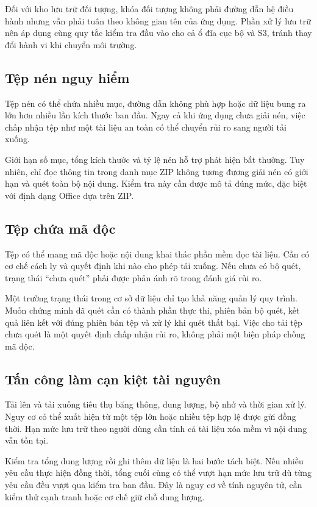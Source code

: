 Đối với kho lưu trữ đối tượng, khóa đối tượng không phải đường dẫn hệ điều hành nhưng vẫn phải tuân theo không gian tên của ứng dụng. Phần xử lý lưu trữ nên áp dụng cùng quy tắc kiểm tra đầu vào cho cả ổ đĩa cục bộ và S3, tránh thay đổi hành vi khi chuyển môi trường.
\subsection{Tệp nén nguy hiểm}
Tệp nén có thể chứa nhiều mục, đường dẫn không phù hợp hoặc dữ liệu bung ra lớn hơn nhiều lần kích thước ban đầu. Ngay cả khi ứng dụng chưa giải nén, việc chấp nhận tệp như một tài liệu an toàn có thể chuyển rủi ro sang người tải xuống.

Giới hạn số mục, tổng kích thước và tỷ lệ nén hỗ trợ phát hiện bất thường. Tuy nhiên, chỉ đọc thông tin trong danh mục ZIP không tương đương giải nén có giới hạn và quét toàn bộ nội dung. Kiểm tra này cần được mô tả đúng mức, đặc biệt với định dạng Office dựa trên ZIP.
\subsection{Tệp chứa mã độc}
Tệp có thể mang mã độc hoặc nội dung khai thác phần mềm đọc tài liệu. Cần có cơ chế cách ly và quyết định khi nào cho phép tải xuống. Nếu chưa có bộ quét, trạng thái ``chưa quét'' phải được phản ánh rõ trong đánh giá rủi ro.

Một trường trạng thái trong cơ sở dữ liệu chỉ tạo khả năng quản lý quy trình. Muốn chứng minh đã quét cần có thành phần thực thi, phiên bản bộ quét, kết quả liên kết với đúng phiên bản tệp và xử lý khi quét thất bại. Việc cho tải tệp chưa quét là một quyết định chấp nhận rủi ro, không phải một biện pháp chống mã độc.
\subsection{Tấn công làm cạn kiệt tài nguyên}
Tải lên và tải xuống tiêu thụ băng thông, dung lượng, bộ nhớ và thời gian xử lý. Nguy cơ có thể xuất hiện từ một tệp lớn hoặc nhiều tệp hợp lệ được gửi đồng thời. Hạn mức lưu trữ theo người dùng cần tính cả tài liệu xóa mềm vì nội dung vẫn tồn tại.

Kiểm tra tổng dung lượng rồi ghi thêm dữ liệu là hai bước tách biệt. Nếu nhiều yêu cầu thực hiện đồng thời, tổng cuối cùng có thể vượt hạn mức lưu trữ dù từng yêu cầu đều vượt qua kiểm tra ban đầu. Đây là nguy cơ về tính nguyên tử, cần kiểm thử cạnh tranh hoặc cơ chế giữ chỗ dung lượng.

